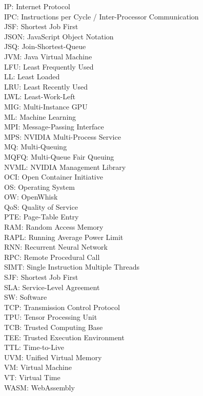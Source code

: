 IP: Internet Protocol \\
IPC: Instructions per Cycle / Inter-Processor Communication \\
JSF: Shortest Job First \\
JSON: JavaScript Object Notation \\
JSQ: Join-Shortest-Queue \\
JVM: Java Virtual Machine \\
LFU: Least Frequently Used \\
LL: Least Loaded \\
LRU: Least Recently Used \\
LWL: Least-Work-Left \\
MIG: Multi-Instance GPU \\
ML: Machine Learning \\
MPI: Message-Passing Interface \\
MPS: NVIDIA Multi-Process Service \\
MQ: Multi-Queuing \\
MQFQ: Multi-Queue Fair Queuing \\
NVML: NVIDIA Management Library \\
OCI: Open Container Initiative \\
OS: Operating System \\
OW: OpenWhisk \\
QoS: Quality of Service \\
PTE: Page-Table Entry \\
RAM: Random Access Memory \\
RAPL: Running Average Power Limit \\
RNN: Recurrent Neural Network \\
RPC: Remote Procedural Call \\
SIMT: Single Instruction Multiple Threads \\
SJF: Shortest Job First \\
SLA: Service-Level Agreement \\
SW: Software \\
TCP: Transmission Control Protocol \\
TPU: Tensor Processing Unit \\
TCB: Trusted Computing Base \\
TEE: Trusted Execution Environment \\
TTL: Time-to-Live \\
UVM: Unified Virtual Memory \\
VM: Virtual Machine \\
VT: Virtual Time \\
WASM: WebAssembly